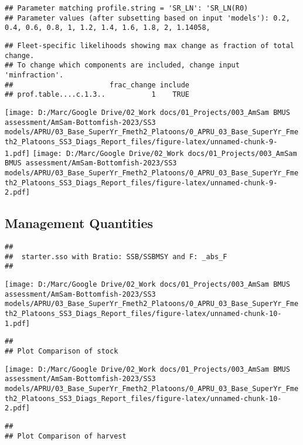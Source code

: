 \documentclass[
]{article}
\begin{document}
\begin{verbatim}
## Parameter matching profile.string = 'SR_LN': 'SR_LN(R0)
## Parameter values (after subsetting based on input 'models'): 0.2, 0.4, 0.6, 0.8, 1, 1.2, 1.4, 1.6, 1.8, 2, 1.14058,
\end{verbatim}

\begin{verbatim}
## Fleet-specific likelihoods showing max change as fraction of total change.
## To change which components are included, change input 'minfraction'.
##                       frac_change include
## prof.table....c.1.3..           1    TRUE
\end{verbatim}

\texttt{[image: D:/Marc/Google Drive/02\_Work docs/01\_Projects/003\_AmSam BMUS assessment/AmSam-Bottomfish-2023/SS3 models/APRU/03\_Base\_SuperYr\_Fmeth2\_Platoons/0\_APRU\_03\_Base\_SuperYr\_Fmeth2\_Platoons\_SS3\_Diags\_Report\_files/figure-latex/unnamed-chunk-9-1.pdf]}
\texttt{[image: D:/Marc/Google Drive/02\_Work docs/01\_Projects/003\_AmSam BMUS assessment/AmSam-Bottomfish-2023/SS3 models/APRU/03\_Base\_SuperYr\_Fmeth2\_Platoons/0\_APRU\_03\_Base\_SuperYr\_Fmeth2\_Platoons\_SS3\_Diags\_Report\_files/figure-latex/unnamed-chunk-9-2.pdf]}

\hypertarget{management-quantities}{%
\subsection{Management Quantities}\label{management-quantities}}

\begin{verbatim}
## 
##  starter.sso with Bratio: SSB/SSBMSY and F: _abs_F 
## 
\end{verbatim}

\texttt{[image: D:/Marc/Google Drive/02\_Work docs/01\_Projects/003\_AmSam BMUS assessment/AmSam-Bottomfish-2023/SS3 models/APRU/03\_Base\_SuperYr\_Fmeth2\_Platoons/0\_APRU\_03\_Base\_SuperYr\_Fmeth2\_Platoons\_SS3\_Diags\_Report\_files/figure-latex/unnamed-chunk-10-1.pdf]}

\begin{verbatim}
## 
## Plot Comparison of stock
\end{verbatim}

\texttt{[image: D:/Marc/Google Drive/02\_Work docs/01\_Projects/003\_AmSam BMUS assessment/AmSam-Bottomfish-2023/SS3 models/APRU/03\_Base\_SuperYr\_Fmeth2\_Platoons/0\_APRU\_03\_Base\_SuperYr\_Fmeth2\_Platoons\_SS3\_Diags\_Report\_files/figure-latex/unnamed-chunk-10-2.pdf]}

\begin{verbatim}
## 
## Plot Comparison of harvest
\end{verbatim}
\end{document}
